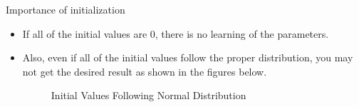 \documentclass{beamer}
\begin{document}
		
	\begin{frame}{Importance of initialization}
		\begin{itemize}
			\item If all of the initial values are 0, there is no learning of the parameters.
			\item Also, even if all of the initial values follow the proper distribution, you may not get the desired result as shown in the figures below.
			\vspace{10pt}
			\begin{figure}[h]
				\centering
				\quad
				\caption{Initial Values Following Normal Distribution}
				\label{fig:signormal}
			\end{figure}
		\end{itemize}
	\end{frame}	
\end{document}
